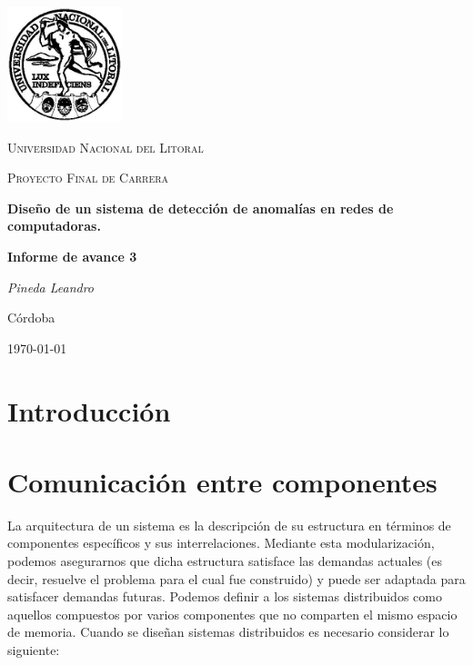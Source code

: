 \documentclass[a4paper,10pt, oneside]{article}
\begin{document}
	
\begin{titlepage}
	\centering
	\includegraphics[width=0.25\textwidth]{../../Universidad_del_Litoral}\par\vspace{1cm}
	{\scshape\LARGE Universidad Nacional del Litoral \par}
	\vspace{1cm}
	{\scshape\Large Proyecto Final de Carrera\par}
	\vspace{1.5cm}
	{\huge\bfseries Diseño de un sistema de detección de anomalías en redes de computadoras.\par}
	\vspace{4cm}
	{\huge\bfseries Informe de avance 3\par}
	\vfill
	
	{\Large \itshape Pineda Leandro\par}
	
	
	\large Córdoba\par
	{\large \today\par}	
\end{titlepage}

\modulolinenumbers[5]
\linenumbers

\section{Introducción}


\section{Comunicación entre componentes}
La arquitectura de un sistema es la descripción de su estructura en términos de componentes específicos y sus interrelaciones. Mediante esta modularización, podemos asegurarnos que dicha estructura satisface las demandas actuales (es decir, resuelve el problema para el cual fue construido) y puede ser adaptada para satisfacer demandas futuras.
Podemos definir a los sistemas distribuidos como aquellos compuestos por varios componentes que no comparten el mismo espacio de memoria\cite{Muhl:2006:DES:1162246}. Cuando se diseñan sistemas distribuidos es necesario considerar lo siguiente: 
\end{document}
